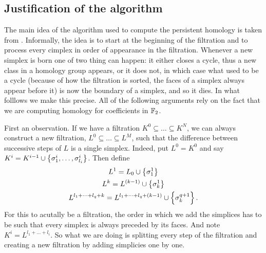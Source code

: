 \documentclass[../main.tex]{subfiles}
\begin{document}
\subsection{Justification of the algorithm}\label{sec:justification}
The main idea of the algorithm used to compute the persistent homology is taken from
\cite{campos}. Informally, the idea is to start at the beginning of the filtration and to
process every cimplex in order of appearance in the filtration. Whenever a new simplex is
born one of two thing can happen: it either closes a cycle, thus a new class in a homology
group appears, or it does not, in which case what used to be a cycle (because of how the
filtration is sorted, the faces of a simplex always appear before it) is now the boundary
of a simplex, and so it dies. In what folllows we make this precise. All of the following
arguments rely on the fact that we are computing homology for coefficients in \( \mathbb{F}_2 \).

First an observation. If we have a filtration \( K^0 \subseteq \dots \subseteq K^N \), we
can always construct a new filtration, \( L^0 \subseteq \dots \subseteq L^M \), such that
the difference between successive steps of \( L \) is a single simplex. Indeed, put \( L^0
= K^0 \) and say \( K^i = K^{i-1} \cup \left\{ \sigma^i_1, \dots, \sigma^i_{l_i} \right\} \). Then define
\begin{gather*}
	L^1 = L_0 \cup \left\{ \sigma_1^1 \right\} \\
	L^{k} = L^{(k-1)} \cup \left\{ \sigma_k^1 \right\} \\
	L^{l_1 + \dots + l_q + k} = L^{l_1 + \dots + l_q + (k-1)} \cup \left\{ \sigma_k^{q+1} \right\}.
\end{gather*}
For this to acutally be a filtration, the order in which we add the simplices has to be
such that every simplex is always preceded by its faces. And note \( K^i = L^{l_1 + \dots
+ l_i} \). So what we are doing is splitting every step of the filtration and creating a
new filtration by adding simplicies one by one. 
\end{document}
